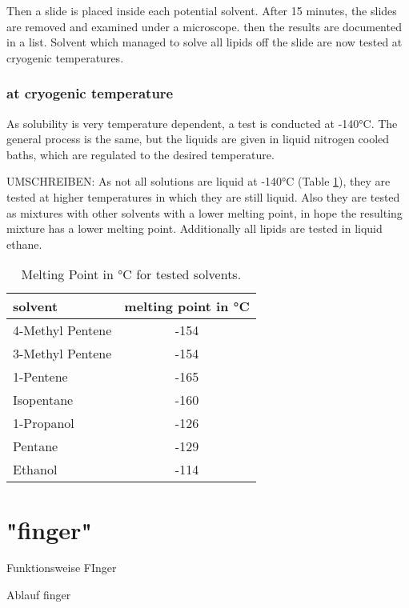 Then a slide is placed inside each potential solvent. After 15 minutes, the slides are removed and examined under a microscope. then the results are documented in a list. Solvent which managed to solve all lipids off the slide are now tested at cryogenic temperatures.

\subsubsection{at cryogenic temperature}
\label{chapter:meltingtemp}

As solubility is very temperature dependent, a test is conducted at -140°C. The general process is the same, but the liquids are given in liquid nitrogen cooled baths, which are regulated to the desired temperature. 

UMSCHREIBEN:
As not all solutions are liquid at -140°C (Table \ref{table:SchmelztemperaturLösungsmittel}), they are tested at higher temperatures in which they are still liquid. Also they are tested as mixtures with other solvents with a lower melting point, in hope the resulting mixture has a lower melting point. Additionally all lipids are tested in liquid ethane.

\begin{table}[hbt!]
	\centering
	\begin{tabular}{|l|c|}
		\hline
		solvent & melting point in °C \\
		\hline
		\hline
		4-Methyl Pentene & -154 \\ 
		\hline
		3-Methyl Pentene & -154 \\
		\hline
		1-Pentene & -165 \\
		\hline
		Isopentane & -160 \\
		\hline
		1-Propanol & -126 \\
		\hline
		Pentane & -129 \\
		\hline
		Ethanol & -114 \\
		\hline
	\end{tabular}
	\caption{Melting Point in °C for tested solvents.}
	\label{table:SchmelztemperaturLösungsmittel}
\end{table}


\section{"finger"}

Funktionsweise FInger

Ablauf finger



